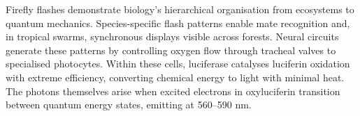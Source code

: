 Firefly flashes demonstrate biology's hierarchical organisation from ecosystems to quantum mechanics. Species-specific flash patterns enable mate recognition and, in tropical swarms, synchronous displays visible across forests. Neural circuits generate these patterns by controlling oxygen flow through tracheal valves to specialised photocytes. Within these cells, luciferase catalyses luciferin oxidation with extreme efficiency, converting chemical energy to light with minimal heat. The photons themselves arise when excited electrons in oxyluciferin transition between quantum energy states, emitting at 560–590 nm. 
